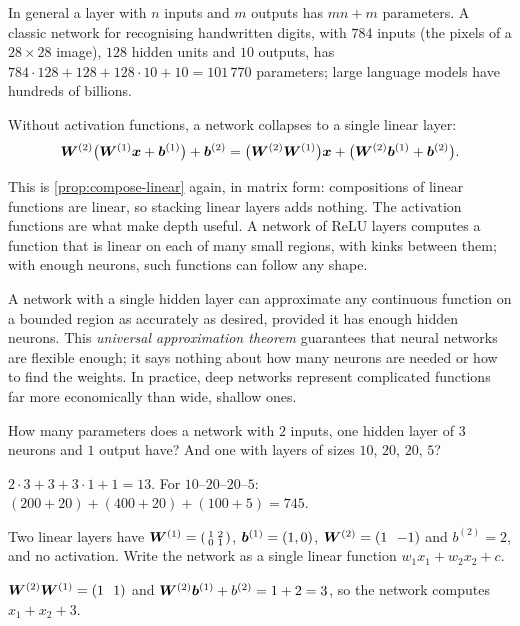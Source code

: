 In general a layer with $n$ inputs and $m$ outputs has $mn + m$ parameters. A
classic network for recognising handwritten digits, with $784$ inputs (the
pixels of a $28\times28$ image), $128$ hidden units and $10$ outputs, has
$784\cdot128 + 128 + 128\cdot10 + 10 = 101\,770$ parameters; large language
models have hundreds of billions.

\begin{proposition}\label{prop:linear-collapse}
Without activation functions, a network collapses to a single linear layer:
\[
  \bm{W}^{(2)}\bigl(\bm{W}^{(1)}\bm{x} + \bm{b}^{(1)}\bigr) + \bm{b}^{(2)}
  = \bigl(\bm{W}^{(2)}\bm{W}^{(1)}\bigr)\bm{x} + \bigl(\bm{W}^{(2)}\bm{b}^{(1)} + \bm{b}^{(2)}\bigr).
\]
\end{proposition}

This is \cref{prop:compose-linear} again, in matrix form: compositions of
linear functions are linear, so stacking linear layers adds nothing. The
activation functions are what make depth useful. A network of ReLU layers
computes a function that is linear on each of many small regions, with kinks
between them; with enough neurons, such functions can follow any shape.

\begin{remark}
A network with a single hidden layer can approximate any continuous function on
a bounded region as accurately as desired, provided it has enough hidden
neurons. This \emph{universal approximation theorem} guarantees that neural
networks are flexible enough; it says nothing about how many neurons are needed
or how to find the weights. In practice, deep networks represent complicated
functions far more economically than wide, shallow ones.
\end{remark}

\sectionexercises

\begin{exercise}
How many parameters does a network with $2$ inputs, one hidden layer of $3$
neurons and $1$ output have? And one with layers of sizes $10$, $20$, $20$, $5$?
\end{exercise}
\begin{solution}
$2\cdot3 + 3 + 3\cdot1 + 1 = 13$. For $10$--$20$--$20$--$5$:
$(200 + 20) + (400 + 20) + (100 + 5) = 745$.
\end{solution}

\begin{exercise}
Two linear layers have $\bm{W}^{(1)} = \left(\begin{smallmatrix} 1 & 2\\ 0 &
1\end{smallmatrix}\right)$, $\bm{b}^{(1)} = (1, 0)$, $\mW^{(2)} = (1\ \ {-1})$ and
$b^{(2)} = 2$, and no activation. Write the network as a single linear function
$w_1x_1 + w_2x_2 + c$.
\end{exercise}
\begin{solution}
$\bm{W}^{(2)}\bm{W}^{(1)} = (1\ \ 1)$ and $\bm{W}^{(2)}\bm{b}^{(1)} + b^{(2)} = 1 + 2 = 3$, so the
network computes $x_1 + x_2 + 3$.
\end{solution}

